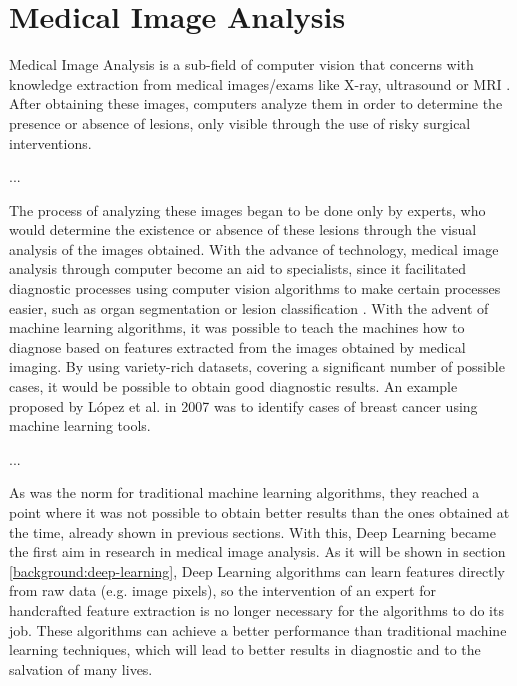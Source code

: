 \documentclass[
  twoside,
  11pt, a4paper,
  footinclude=true,
  headinclude=true,
  cleardoublepage=empty
]{scrbook}
\begin{document}
    \section{Medical Image Analysis} \label{background:medical-image}
      Medical Image Analysis is a sub-field of computer vision that concerns with knowledge extraction from medical images/exams like X-ray, ultrasound or MRI \cite{dhawan2011medical}. After obtaining these images, computers analyze them in order to determine the presence or absence of lesions, only visible through the use of risky surgical interventions.

      ...

      The process of analyzing these images began to be done only by experts, who would determine the existence or absence of these lesions through the visual analysis of the images obtained. With the advance of technology, medical image analysis through computer become an aid to specialists, since it facilitated diagnostic processes using computer vision algorithms to make certain processes easier, such as organ segmentation \cite{karssemeijer1988recognition, punia2013review} or lesion classification \cite{wolberg1994machine} . With the advent of machine learning algorithms, it was possible to teach the machines how to diagnose based on features extracted from the images obtained by medical imaging. By using variety-rich datasets, covering a significant number of possible cases, it would be possible to obtain good diagnostic results. An example proposed by López et al. in 2007 \cite{lopez2007breast} was to identify cases of breast cancer using machine learning tools.

      ...

      As was the norm for traditional machine learning algorithms, they reached a point where it was not possible to obtain better results than the ones obtained at the time, already shown in previous sections. With this, Deep Learning became the first aim in research in medical image analysis. As it will be shown in section \ref{background:deep-learning}, Deep Learning algorithms can learn features directly from raw data (e.g. image pixels), so the intervention of an expert for handcrafted feature extraction is no longer necessary for the algorithms to do its job. These algorithms can achieve a better performance than traditional machine learning techniques, which will lead to better results in diagnostic and to the salvation of many lives.
\end{document}
